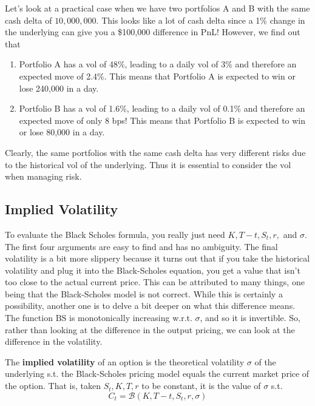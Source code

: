 \documentclass{article}
\begin{document}
    \begin{example}
      Let's look at a practical case when we have two portfolios A and B with the same cash delta of $10,000,000$. This looks like a lot of cash delta since a 1\% change in the underlying can give you a \$100,000 difference in PnL! However, we find out that 
      \begin{enumerate}
        \item Portfolio A has a vol of 48\%, leading to a daily vol of 3\% and therefore an expected move of 2.4\%. This means that Portfolio A is expected to win or lose 240,000 in a day.  
        \item Portfolio B has a vol of 1.6\%, leading to a daily vol of 0.1\% and therefore an expected move of only 8 bps! This means that Portfolio B is expected to win or lose 80,000 in a day. 
      \end{enumerate}
      Clearly, the same portfolios with the same cash delta has very different risks due to the historical vol of the underlying. Thus it is essential to consider the vol when managing risk. 
    \end{example}

  \subsection{Implied Volatility}

    To evaluate the Black Scholes formula, you really just need $K, T - t, S_t, r,$ and $\sigma$. The first four arguments are easy to find and has no ambiguity. The final volatility is a bit more slippery because it turns out that if you take the historical volatility and plug it into the Black-Scholes equation, you get a value that isn't too close to the actual current price. This can be attributed to many things, one being that the Black-Scholes model is not correct. While this is certainly a possibility, another one is to delve a bit deeper on what this difference means. The function $\mathrm{BS}$ is monotonically increasing w.r.t. $\sigma$, and so it is invertible. So, rather than looking at the difference in the output pricing, we can look at the difference in the volatility. 

    \begin{definition}
      The \textbf{implied volatility} of an option is the theoretical volatility $\sigma$ of the underlying s.t. the Black-Scholes pricing model equals the current market price of the option. That is, taken $S_t, K, T, r$ to be constant, it is the value of $\sigma$ s.t. 
      \begin{equation}
        C_t = \mathcal{B}(K, T - t, S_t, r, \sigma)
      \end{equation}
    \end{definition}
\end{document}
